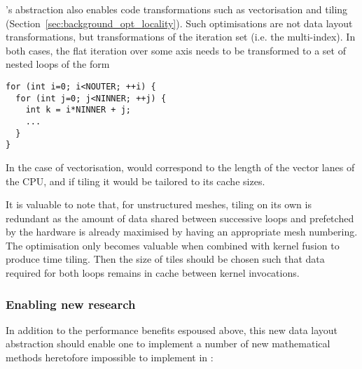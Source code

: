 's abstraction also enables code transformations such as vectorisation and tiling (Section~\ref{sec:background_opt_locality}).
Such optimisations are not data layout transformations, but transformations of the iteration set (i.e. the multi-index).
In both cases, the flat iteration over some axis needs to be transformed to a set of nested loops of the form

\begin{minipage}{\textwidth}
\begin{verbatim}
for (int i=0; i<NOUTER; ++i) {
  for (int j=0; j<NINNER; ++j) {
    int k = i*NINNER + j;
    ...
  }
}
\end{verbatim}
\end{minipage}

In the case of vectorisation,  would correspond to the length of the vector lanes of the CPU, and if tiling it would be tailored to its cache sizes.

It is valuable to note that, for unstructured meshes, tiling on its own is redundant as the amount of data shared between successive loops and prefetched by the hardware is already maximised by having an appropriate mesh numbering.
The optimisation only becomes valuable when combined with kernel fusion to produce time tiling.
Then the size of tiles should be chosen such that data required for both loops remains in cache between kernel invocations.

\subsubsection{Enabling new research}

In addition to the performance benefits espoused above, this new data layout abstraction should enable one to implement a number of new mathematical methods heretofore impossible to implement in :

